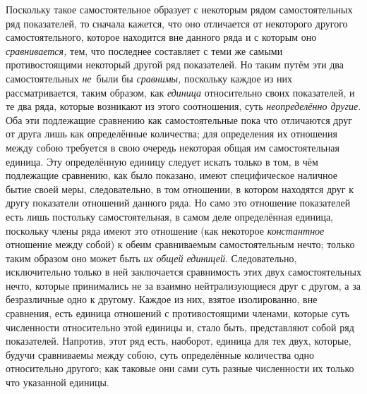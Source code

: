 Поскольку такое самостоятельное образует с некоторым рядом самостоятельных ряд
показателей, то сначала кажется, что оно отличается от некоторого другого
самостоятельного, которое находится вне данного ряда и с которым оно
{\em сравнивается,} тем, что последнее составляет с теми же самыми
противостоящими некоторый другой ряд показателей. Но таким путём эти два
самостоятельных {\em не}~были бы {\em сравнимы,} поскольку каждое из них
рассматривается, таким образом, как {\em единица} относительно своих
показателей, и те два ряда, которые возникают из этого соотношения, суть
{\em неопределённо другие}. Оба эти подлежащие сравнению как самостоятельные
пока что отличаются друг от друга лишь как определённые количества; для
определения их отношения между собою требуется в свою очередь некоторая общая
им самостоятельная единица. Эту определённую единицу следует искать только в
том, в чём подлежащие сравнению, как было показано, имеют специфическое
наличное бытие своей меры, следовательно, в том отношении, в котором находятся
друг к другу показатели отношений данного ряда. Но само это отношение
показателей есть лишь постольку самостоятельная, в самом деле определённая
единица, поскольку члены ряда имеют это отношение (как некоторое
{\em константное} отношение между собой) к обеим сравниваемым самостоятельным
нечто; только таким образом оно может быть {\em их общей единицей}.
Следовательно, исключительно только в ней заключается сравнимость этих двух
самостоятельных нечто, которые принимались не за взаимно нейтрализующиеся друг
с другом, а за безразличные одно к другому. Каждое из них, взятое изолированно,
вне сравнения, есть единица отношений с противостоящими членами, которые суть
численности относительно этой единицы и, стало быть, представляют собой ряд
показателей. Напротив, этот ряд есть, наоборот, единица для тех двух, которые,
будучи сравниваемы между собою, суть определённые количества одно относительно
другого; как таковые они сами суть разные численности их только что указанной
единицы.

